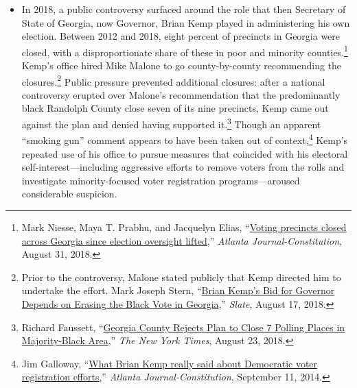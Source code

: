 \documentclass[12pt]{article}
\begin{document}
\begin{itemize}
Further partisan efforts to close polling places in a partisan manner occurred in 2018, when the state passed a law that forced the closure of early voting sites by raising operating costs. The requirement that all early voting sites to be open from 7 a.m. to 7 p.m. was credited with a 17 percent decline in the total number of early voting sites statewide, with a disproportionate share of closures occurring in poor, rural counties.\footnote{Blake Paterson, ``\href{https://www.propublica.org/article/bipartisan-furor-as-north-carolina-election-law-shrinks-early-voting-locations-by-almost-20-percent}{Bipartisan Furor as North Carolina Election Law Shrinks Early Voting Locations by Almost 20 Percent},'' \emph{ProPublica}, September 24, 2018.}

\item In 2018, a public controversy surfaced around the role that then Secretary of State of Georgia, now Governor, Brian Kemp played in administering his own election. Between 2012 and 2018, eight percent of precincts in Georgia were closed, with a disproportionate share of these in poor and minority counties.\footnote{Mark Niesse, Maya T. Prabhu, and Jacquelyn Elias, ``\href{https://www.ajc.com/news/state--regional-govt--politics/voting-precincts-closed-across-georgia-since-election-oversight-lifted/}{Voting precincts closed across Georgia since election oversight lifted},'' \emph{Atlanta Journal-Constitution}, August 31, 2018.} Kemp's office hired Mike Malone to go county-by-county recommending the closures.\footnote{Prior to the controversy, Malone stated publicly that Kemp directed him to undertake the effort. Mark Joseph Stern, ``\href{https://slate.com/news-and-politics/2018/08/georgia-voter-suppression-brian-kemps-bid-for-governor-depends-on-erasing-the-black-vote-its-working.html}{Brian Kemp's Bid for Governor Depends on Erasing the Black Vote in Georgia},'' \emph{Slate}, August 17, 2018.} Public pressure prevented additional closures: after a national controversy erupted over Malone's recommendation that the predominantly black Randolph County close seven of its nine precincts, Kemp came out against the plan and denied having supported it.\footnote{Richard Faussett, ``\href{https://www.nytimes.com/2018/08/23/us/randolph-county-georgia-voting.html}{Georgia County Rejects Plan to Close 7 Polling Places in Majority-Black Area},'' \emph{The New York Times}, August 23, 2018.} Though an apparent ``smoking gun'' comment appears to have been taken out of context,\footnote{Jim Galloway, ``\href{https://www.ajc.com/blog/politics/what-brian-kemp-really-said-about-democratic-voter-registration-efforts/gQEO53Zry1ifbLlOYtcsRI/}{What Brian Kemp really said about Democratic voter registration efforts},'' \emph{Atlanta Journal-Constitution}, September 11, 2014.} Kemp's repeated use of his office to pursue measures that coincided with his electoral self-interest---including aggressive efforts to remove voters from the rolls and investigate minority-focused voter registration programs---aroused considerable suspicion.

\end{itemize}
\end{document}
